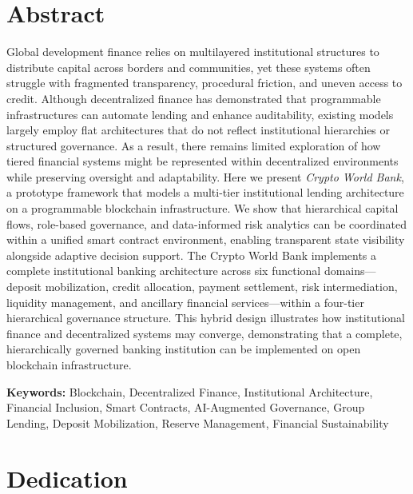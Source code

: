 \documentclass[12pt,a4paper]{report}
\begin{document}
\chapter*{Abstract}

Global development finance relies on multilayered institutional structures to distribute capital across borders and communities, yet these systems often struggle with fragmented transparency, procedural friction, and uneven access to credit. Although decentralized finance has demonstrated that programmable infrastructures can automate lending and enhance auditability, existing models largely employ flat architectures that do not reflect institutional hierarchies or structured governance. As a result, there remains limited exploration of how tiered financial systems might be represented within decentralized environments while preserving oversight and adaptability. Here we present \textit{Crypto World Bank}, a prototype framework that models a multi-tier institutional lending architecture on a programmable blockchain infrastructure. We show that hierarchical capital flows, role-based governance, and data-informed risk analytics can be coordinated within a unified smart contract environment, enabling transparent state visibility alongside adaptive decision support. The Crypto World Bank implements a complete institutional banking architecture across six functional domains---deposit mobilization, credit allocation, payment settlement, risk intermediation, liquidity management, and ancillary financial services---within a four-tier hierarchical governance structure. This hybrid design illustrates how institutional finance and decentralized systems may converge, demonstrating that a complete, hierarchically governed banking institution can be implemented on open blockchain infrastructure.

\vspace{0.5em}
\noindent\textbf{Keywords:} Blockchain, Decentralized Finance, Institutional Architecture, Financial Inclusion, Smart Contracts, AI-Augmented Governance, Group Lending, Deposit Mobilization, Reserve Management, Financial Sustainability

\newpage
\thispagestyle{empty}

\chapter*{Dedication}
\end{document}
